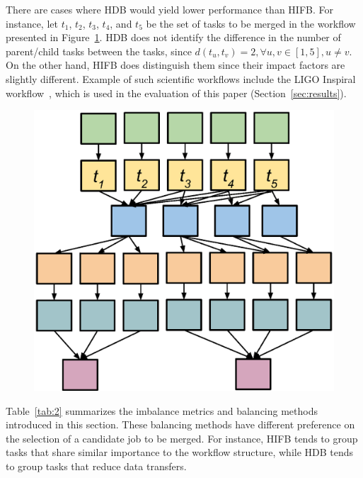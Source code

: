 \documentclass[final,5p,times,twocolumn]{elsarticle}
\begin{document}
There are cases where HDB would yield lower performance than HIFB. For instance, let $t_1$, $t_2$, $t_3$, $t_4$, and $t_5$ be the set of tasks to be merged in the workflow presented in Figure~\ref{fig:imbalance_hifb_hdb}. HDB does not identify the difference in the number of parent/child tasks between the tasks, since $d(t_u,t_v) = 2, \forall u,v \in [1,5], u \neq v$. On the other hand, HIFB does distinguish them since their impact factors are slightly different. Example of such scientific workflows include the LIGO Inspiral workflow~\cite{LIGO}, which is used in the evaluation of this paper (Section~\ref{sec:results}).

\begin{figure}[!htb]
	\centering
	\includegraphics[width=0.85\linewidth]{figure11.eps}
	\label{fig:imbalance_hifb_hdb}
\end{figure}

Table~\ref{tab:2} summarizes the imbalance metrics and balancing methods introduced in this section. These balancing methods have different preference on the selection of a candidate job to be merged. For instance, HIFB tends to group tasks that share similar importance to the workflow structure, while HDB tends to group tasks that reduce data transfers.
\end{document}
